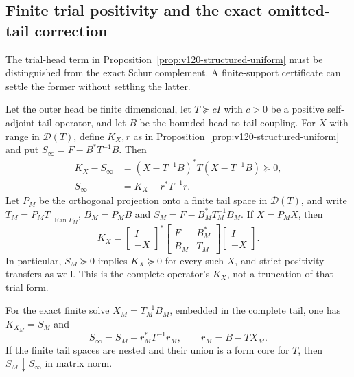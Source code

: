\subsection*{Finite trial positivity and the exact omitted-tail correction}

The trial-head term in Proposition~\ref{prop:v120-structured-uniform}
must be distinguished from the exact Schur complement. A finite-support
certificate can settle the former without settling the latter.

\begin{proposition}
\label{prop:v121-finite-trial}
Let the outer head be finite dimensional, let $T\succeq cI$ with
$c>0$ be a positive self-adjoint tail operator, and let $B$ be the
bounded head-to-tail coupling. For $X$ with range in $\mathcal D(T)$,
define $K_X,r$ as in Proposition~\ref{prop:v120-structured-uniform}
and put $S_\infty=F-B^*T^{-1}B$. Then
\begin{align}
 K_X-S_\infty
  &=(X-T^{-1}B)^*T(X-T^{-1}B)\succeq0,
       \label{eq:v121-square}\\
 S_\infty&=K_X-r^*T^{-1}r.\label{eq:v121-residual}
\end{align}
Let $P_M$ be the orthogonal projection onto a finite tail space in $\mathcal D(T)$, and
write $T_M=P_MT|_{\operatorname{Ran}P_M}$, $B_M=P_MB$ and
$S_M=F-B_M^*T_M^{-1}B_M$. If $X=P_MX$, then
\begin{equation}\label{eq:v121-finite-trial}
 K_X=\begin{bmatrix}I\\-X\end{bmatrix}^{*}
       \begin{bmatrix}F&B_M^*\\B_M&T_M\end{bmatrix}
       \begin{bmatrix}I\\-X\end{bmatrix}.
\end{equation}
In particular, $S_M\succeq0$ implies $K_X\succeq0$ for every such
$X$, and strict positivity transfers as well. This is the complete
operator's $K_X$, not a truncation of that trial form.

For the exact finite solve $X_M=T_M^{-1}B_M$, embedded in the complete
tail, one has $K_{X_M}=S_M$ and
\begin{equation}\label{eq:v121-galerkin-defect}
 \boxed{S_\infty=S_M-r_M^*T^{-1}r_M,
 \qquad r_M=B-TX_M.}
\end{equation}
If the finite tail spaces are nested and their union is a form core
for $T$, then $S_M\downarrow S_\infty$ in matrix norm.
\end{proposition}

